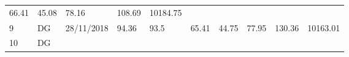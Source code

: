 \documentclass[
  11pt,
]{article}
\begin{document}
\begin{longtable}[]{@{}llllllllll@{}}
\begin{minipage}[t]{0.06\columnwidth}
66.41\strut
\end{minipage} & \begin{minipage}[t]{0.06\columnwidth}\raggedright
45.08\strut
\end{minipage} & \begin{minipage}[t]{0.06\columnwidth}\raggedright
78.16\strut
\end{minipage} & \begin{minipage}[t]{0.13\columnwidth}\raggedright
108.69\strut
\end{minipage} & \begin{minipage}[t]{0.08\columnwidth}\raggedright
10184.75\strut
\end{minipage}\tabularnewline
\begin{minipage}[t]{0.04\columnwidth}\raggedright
9\strut
\end{minipage} & \begin{minipage}[t]{0.09\columnwidth}\raggedright
DG\strut
\end{minipage} & \begin{minipage}[t]{0.10\columnwidth}\raggedright
28/11/2018\strut
\end{minipage} & \begin{minipage}[t]{0.06\columnwidth}\raggedright
94.36\strut
\end{minipage} & \begin{minipage}[t]{0.06\columnwidth}\raggedright
93.5\strut
\end{minipage} & \begin{minipage}[t]{0.06\columnwidth}\raggedright
65.41\strut
\end{minipage} & \begin{minipage}[t]{0.06\columnwidth}\raggedright
44.75\strut
\end{minipage} & \begin{minipage}[t]{0.06\columnwidth}\raggedright
77.95\strut
\end{minipage} & \begin{minipage}[t]{0.13\columnwidth}\raggedright
130.36\strut
\end{minipage} & \begin{minipage}[t]{0.08\columnwidth}\raggedright
10163.01\strut
\end{minipage}\tabularnewline
\begin{minipage}[t]{0.04\columnwidth}\raggedright
10\strut
\end{minipage} & \begin{minipage}[t]{0.09\columnwidth}\raggedright
DG\strut
\end{minipage} & \begin{minipage}[t]{0.10\columnwidth}\raggedright

\end{minipage}
\end{longtable}
\end{document}
